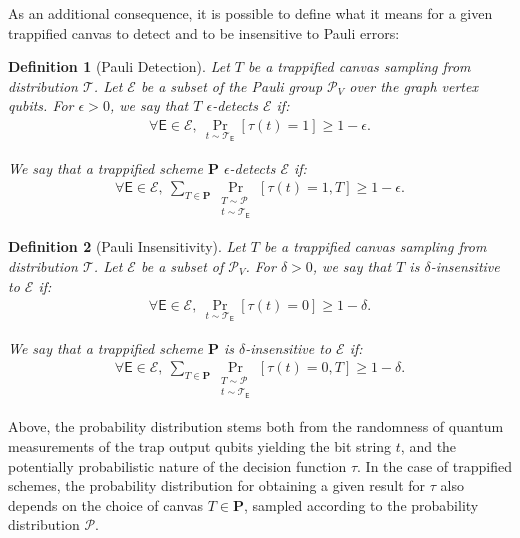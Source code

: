 \documentclass[12pt]{iopart}
\newcommand{\cptp}[1]{\mathsf{#1}} \newcommand{\pd}[1]{\mathcal{#1}}  \newcommand{\sch}[1]{\bm{#1}}
\renewcommand{\1}{\mathds{1}}
\newtheorem{definition}{Definition}
\begin{document}
As an additional consequence, it is possible to define what it means for a given trappified canvas to detect and to be insensitive to Pauli errors:

\begin{definition}[Pauli Detection]
  \label{def:detect_tp}
  Let $T$ be a trappified canvas sampling from distribution $\pd T$.
  Let $\mathcal{E}$ be a subset of the Pauli group $\mathcal P_V$ over the graph vertex qubits.
  For $\epsilon > 0$, we say that $T$ \emph{$\epsilon$-detects} $\mathcal{E}$ if: 
  \begin{align}
    \forall \cptp E \in \mathcal{E},\ \Pr_{t\sim \pd T_{\cptp E}}[\tau(t) = 1] \geq 1-\epsilon.
  \end{align}
  
  We say that a trappified scheme $\sch P$ \emph{$\epsilon$-detects} $\mathcal{E}$ if:
  \begin{align}
    \forall \cptp E \in \mathcal{E}, \ \sum_{T\in \sch P} \Pr_{\substack{T \sim \pd P \\ t\sim \pd T_{\cptp E}}}[\tau(t) = 1, T] \geq 1-\epsilon.
  \end{align}
\end{definition}

\begin{definition}[Pauli Insensitivity]
  \label{def:insens_tp}
  Let $T$ be a trappified canvas sampling from distribution $\pd T$.
  Let $\mathcal{E}$ be a subset of $\mathcal P_V$.
  For $\delta > 0$, we say that $T$ is \emph{$\delta$-insensitive to} $\mathcal{E}$ if:   
  \begin{align}
     \forall \cptp E \in \mathcal{E}, \ \Pr_{t\sim \pd T_{\cptp E}}[\tau(t) = 0] \geq 1-\delta.
  \end{align}
  
  We say that a trappified scheme $\sch P$ is \emph{$\delta$-insensitive to} $\mathcal{E}$ if:
  \begin{align}
    \forall \cptp E \in \mathcal{E}, \ \sum_{T\in \sch P} \Pr_{\substack{T\sim \pd P \\ t\sim \pd T_{\cptp E}}}[\tau(t) = 0, T] \geq 1-\delta.
  \end{align}
\end{definition}

Above, the probability distribution stems both from the randomness of quantum measurements of the trap output qubits yielding the bit string $t$, and the potentially probabilistic nature of the decision function $\tau$. 
In the case of trappified schemes, the probability distribution for obtaining a given result for $\tau$ also depends on the choice of canvas $T \in \sch P$, sampled according to the probability distribution $\pd P$.
\end{document}
